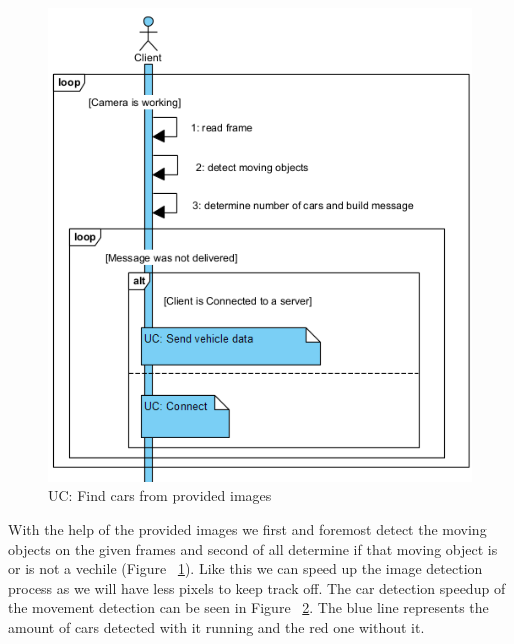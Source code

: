 \documentclass[17pt]{article}
\begin{document}
\begin{figure}[h!]
    \includegraphics[width=\textwidth]{UC/ProcessImageAndFindTheCars.png}
    \caption{UC: Find cars from provided images}
    \label{fig:UC_FindCars}
\end{figure}

\pagebreak
With the help of the provided images we first and
foremost detect the moving objects on the given frames and second of all
determine if that moving object is or is not a vechile (Figure ~\ref{fig:UC_FindCars}).
Like this we can speed up the image detection process as we will have less pixels
to keep track off. The car detection speedup of the movement detection can be 
seen in Figure ~\ref{fig:Comparison}. The blue line represents the amount of cars 
detected with it running and the red one without it.
\begin{figure}[h!]
    \centering
    \label{fig:Comparison}
\end{figure}
\end{document}
